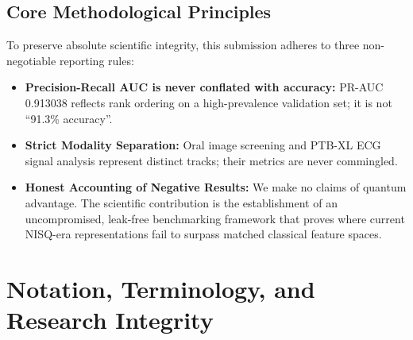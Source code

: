 \documentclass[11pt,a4paper]{report}
\begin{document}
\section*{Core Methodological Principles}
To preserve absolute scientific integrity, this submission adheres to three non-negotiable reporting rules:
\begin{itemize}
  \item \textbf{Precision-Recall AUC is never conflated with accuracy:} PR-AUC 0.913038 reflects rank ordering on a high-prevalence validation set; it is not ``91.3\% accuracy''.
  \item \textbf{Strict Modality Separation:} Oral image screening and PTB-XL ECG signal analysis represent distinct tracks; their metrics are never commingled.
  \item \textbf{Honest Accounting of Negative Results:} We make no claims of quantum advantage. The scientific contribution is the establishment of an uncompromised, leak-free benchmarking framework that proves where current NISQ-era representations fail to surpass matched classical feature spaces.
\end{itemize}

\vspace{0.8cm}
\tableofcontents
\listoffigures
\listoftables

\newpage
\chapter*{Notation, Terminology, and Research Integrity}
\end{document}
